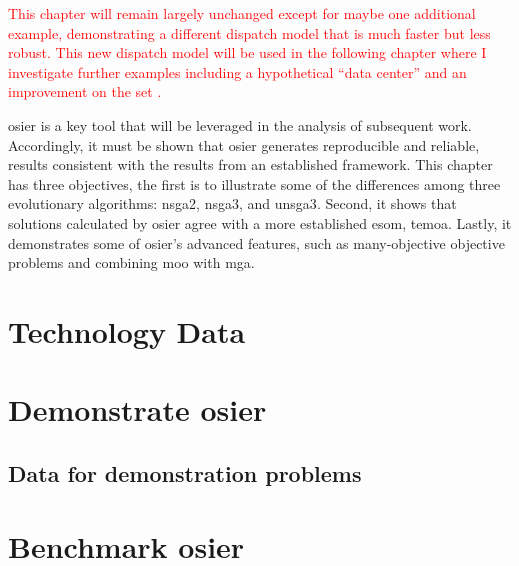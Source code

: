 \textcolor{red}{This chapter will remain largely unchanged except for maybe one
additional example, demonstrating a different dispatch model that is much faster
but less robust. This new dispatch model will be used in the following chapter
where I investigate further examples including a hypothetical ``data center''
and an improvement on the \acf{set} \cite{wigeland_nuclear_2014}.}

\ac{osier} is a key tool that will be leveraged in the analysis of subsequent
work. Accordingly, it must be shown that \ac{osier} generates reproducible and
reliable, results consistent with the results from an established framework.
This chapter has three objectives, the first is to illustrate some of the
differences among three evolutionary algorithms: \ac{nsga2}, \ac{nsga3}, and
\ac{unsga3}. Second, it shows that solutions calculated by \ac{osier} agree with
a more established \ac{esom}, \ac{temoa}. Lastly, it demonstrates some of
\ac{osier}'s advanced features, such as many-objective objective problems and
combining \ac{moo} with \ac{mga}.

\section{Technology Data}

\section{Demonstrate \ac{osier}}
\subsection{Data for demonstration problems}



\section{Benchmark \ac{osier}}




